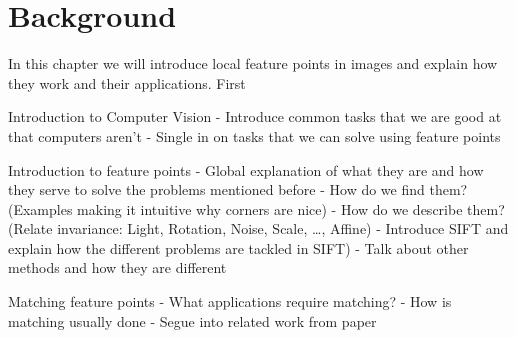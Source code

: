 \chapter{Background}

In this chapter we will introduce local feature points in images and 
explain how they work and their applications. First 

Introduction to Computer Vision
 - Introduce common tasks that we are good at that computers aren't
 - Single in on tasks that we can solve using feature points

Introduction to feature points
 - Global explanation of what they are and how they serve to solve the 
problems mentioned before
 - How do we find them? (Examples making it intuitive why corners are 
nice)
 - How do we describe them? (Relate invariance: Light, Rotation, Noise, 
 Scale, \ldots, Affine)
 - Introduce SIFT and explain how the different problems are tackled in 
SIFT)
 - Talk about other methods and how they are different

Matching feature points
 - What applications require matching?
 - How is matching usually done
 - Segue into related work from paper
